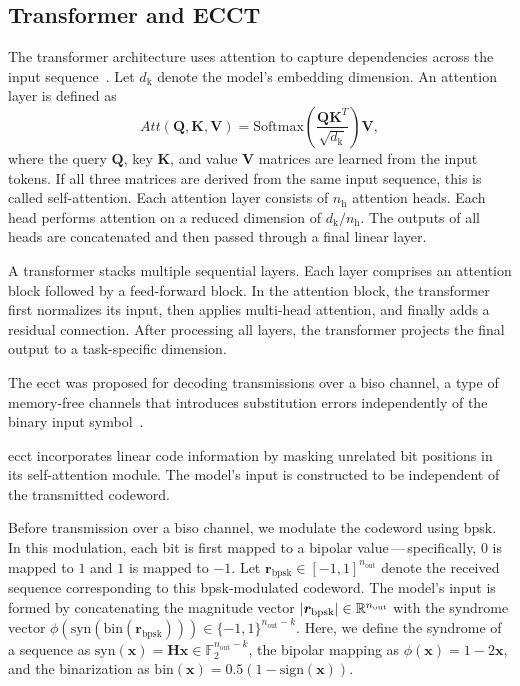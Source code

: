 \documentclass[conference,letterpaperu]{IEEEtran}
\DeclarePairedDelimiter\abs{\lvert}{\rvert}%
\newcommand{\nout}{\ensuremath{n_{\text{out}}}}
\newcommand{\recbpsk}{\ensuremath{\bm{r}_{\text{bpsk}}}}
\newcommand{\nrecbpsk}{\ensuremath{\nout}}
\newcommand{\bipolar}{\ensuremath{\phi}}
\newcommand{\syndrome}{\ensuremath{\text{syn}}}
\newcommand{\bin}{\ensuremath{\text{bin}}}
\newcommand{\pc}{\ensuremath{\bm{H}}}
\newcommand{\attQuery}{\ensuremath{\bm{Q}}}
\newcommand{\attKey}{\ensuremath{\bm{K}}}
\newcommand{\attValue}{\ensuremath{\bm{V}}}
\newcommand{\hiddenDim}{\ensuremath{d_{\text{k}}}}
\newcommand{\nheads}{\ensuremath{n_{\text{h}}}}
\begin{document}
\subsection{Transformer and ECCT}
\label{sec:TransformerAndECCT}
The transformer architecture uses attention to capture dependencies across the input sequence~\cite{vaswaniAttentionAllYou2017a}. Let \( \hiddenDim \) denote the model's embedding dimension. An attention layer is defined as
\begin{equation}
\label{eq:attention}
Att(\attQuery, \attKey, \attValue) = \text{Softmax}\left(\frac{\attQuery \attKey^T}{\sqrt{\hiddenDim}}\right)\attValue,
\end{equation}
where the query $\attQuery$, key $\attKey$, and value $\attValue$ matrices are learned from the input tokens. If all three matrices are derived from the same input sequence, this is called self-attention. Each attention layer consists of $\nheads$ attention heads. Each head performs attention on a reduced dimension of $\hiddenDim/\nheads$. The outputs of all heads are concatenated and then passed through a final linear layer.

A transformer stacks multiple sequential layers. Each layer comprises an attention block followed by a feed-forward block. In the attention block, the transformer first normalizes its input, then applies multi-head attention, and finally adds a residual connection. After processing all layers, the transformer projects the final output to a task-specific dimension.

The \ac{ecct} was proposed for decoding transmissions over a \ac{biso} channel, a type of memory-free channels that introduces substitution errors independently of the binary input symbol~\cite{choukrounErrorCorrectionCode2022b}. 

\ac{ecct} incorporates linear code information by masking unrelated bit positions in its self-attention module. The model's input is constructed to be independent of the transmitted codeword. 

Before transmission over a \ac{biso} channel, we modulate the codeword using \ac{bpsk}. In this modulation, each bit is first mapped to a bipolar value\,---\,specifically, $0$ is mapped to $1$ and $1$ is mapped to $-1$.
Let $\recbpsk \in [-1, 1]^{\nrecbpsk}$ denote the received sequence corresponding to this \ac{bpsk}-modulated codeword. The model's input is formed by concatenating the magnitude vector $\abs{\recbpsk} \in \mathbb{R}^{\nrecbpsk}$ with the syndrome vector $\bipolar(\syndrome(\bin(\recbpsk))) \in \{-1, 1\}^{\nrecbpsk - k}$. Here, we define the syndrome of a sequence as $\syndrome(\bm{x}) = \pc \bm{x} \in \mathbb{F}_2^{\nrecbpsk - k}$, the bi\-polar mapping as $\bipolar(\bm{x}) = 1 - 2\bm{x}$, and the binarization as $\bin(\bm{x}) = 0.5(1 - \text{sign}(\bm{x}))$.
\end{document}
